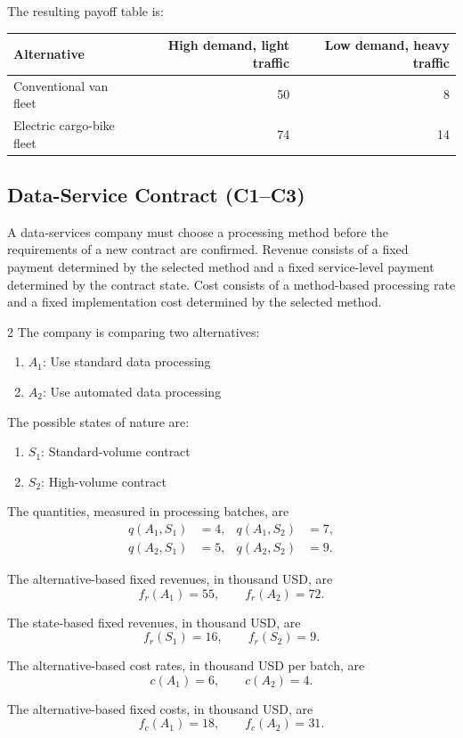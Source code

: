 The resulting payoff table is:

\begin{center}
	\begin{tabular}{lrr}
		\toprule
		Alternative & High demand, light traffic & Low demand, heavy traffic \\
		\midrule
		Conventional van fleet & 50 & 8 \\
		Electric cargo-bike fleet & 74 & 14 \\
		\bottomrule
	\end{tabular}
\end{center}


\subsection{Data-Service Contract (C1--C3)}
\label{sec:problem14-data-service-contract-c1-c3}

A data-services company must choose a processing method before the requirements
of a new contract are confirmed. Revenue consists of a fixed payment determined
by the selected method and a fixed service-level payment determined by the
contract state. Cost consists of a method-based processing rate and a fixed
implementation cost determined by the selected method.

\begin{multicols}{2}
	The company is comparing two alternatives:
	\begin{enumerate}[label=\arabic*.]
		\item \(A_1\): Use standard data processing
		\item \(A_2\): Use automated data processing
	\end{enumerate}
	
	The possible states of nature are:
	\begin{enumerate}[label=\arabic*.]
		\item \(S_1\): Standard-volume contract
		\item \(S_2\): High-volume contract
	\end{enumerate}
	
	\columnbreak
	
	The quantities, measured in processing batches, are
	\[
	\begin{aligned}
		q(A_1,S_1)&=4,
		&
		q(A_1,S_2)&=7,
		\\
		q(A_2,S_1)&=5,
		&
		q(A_2,S_2)&=9.
	\end{aligned}
	\]
	
	The alternative-based fixed revenues, in thousand USD, are
	\[
	f_r(A_1)=55,
	\qquad
	f_r(A_2)=72.
	\]
	
	The state-based fixed revenues, in thousand USD, are
	\[
	f_r(S_1)=16,
	\qquad
	f_r(S_2)=9.
	\]
	
	The alternative-based cost rates, in thousand USD per batch, are
	\[
	c(A_1)=6,
	\qquad
	c(A_2)=4.
	\]
	
	The alternative-based fixed costs, in thousand USD, are
	\[
	f_c(A_1)=18,
	\qquad
	f_c(A_2)=31.
	\]
\end{multicols}

